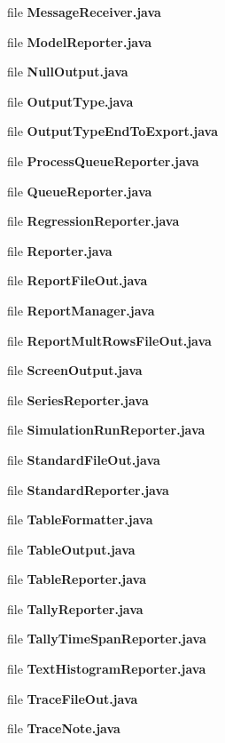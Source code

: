 \begin{DoxyCompactItemize}
\item 
file {\bfseries Message\-Receiver.\-java}
\item 
file {\bfseries Model\-Reporter.\-java}
\item 
file {\bfseries Null\-Output.\-java}
\item 
file {\bfseries Output\-Type.\-java}
\item 
file {\bfseries Output\-Type\-End\-To\-Export.\-java}
\item 
file {\bfseries Process\-Queue\-Reporter.\-java}
\item 
file {\bfseries Queue\-Reporter.\-java}
\item 
file {\bfseries Regression\-Reporter.\-java}
\item 
file {\bfseries Reporter.\-java}
\item 
file {\bfseries Report\-File\-Out.\-java}
\item 
file {\bfseries Report\-Manager.\-java}
\item 
file {\bfseries Report\-Mult\-Rows\-File\-Out.\-java}
\item 
file {\bfseries Screen\-Output.\-java}
\item 
file {\bfseries Series\-Reporter.\-java}
\item 
file {\bfseries Simulation\-Run\-Reporter.\-java}
\item 
file {\bfseries Standard\-File\-Out.\-java}
\item 
file {\bfseries Standard\-Reporter.\-java}
\item 
file {\bfseries Table\-Formatter.\-java}
\item 
file {\bfseries Table\-Output.\-java}
\item 
file {\bfseries Table\-Reporter.\-java}
\item 
file {\bfseries Tally\-Reporter.\-java}
\item 
file {\bfseries Tally\-Time\-Span\-Reporter.\-java}
\item 
file {\bfseries Text\-Histogram\-Reporter.\-java}
\item 
file {\bfseries Trace\-File\-Out.\-java}
\item 
file {\bfseries Trace\-Note.\-java}
\end{DoxyCompactItemize}

